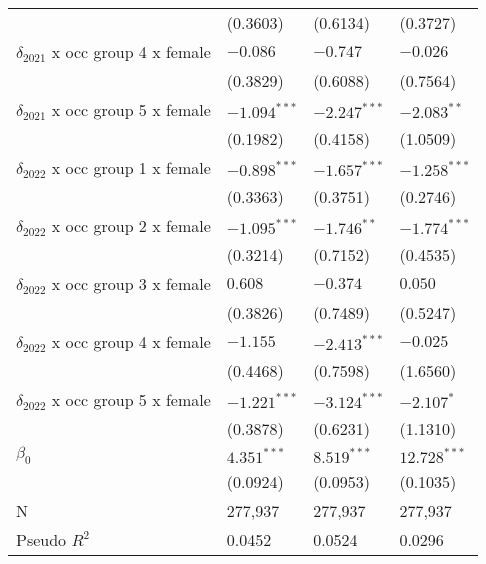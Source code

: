 \begin{tabular}{llll}
                                       &           (0.3603) &           (0.6134) &           (0.3727) \\
$\delta_{2021}$ x occ group 4 x female &           $-0.086$ &           $-0.747$ &           $-0.026$ \\
                                       &           (0.3829) &           (0.6088) &           (0.7564) \\
$\delta_{2021}$ x occ group 5 x female &     $-1.094^{***}$ &     $-2.247^{***}$ &      $-2.083^{**}$ \\
                                       &           (0.1982) &           (0.4158) &           (1.0509) \\
$\delta_{2022}$ x occ group 1 x female &     $-0.898^{***}$ &     $-1.657^{***}$ &     $-1.258^{***}$ \\
                                       &           (0.3363) &           (0.3751) &           (0.2746) \\
$\delta_{2022}$ x occ group 2 x female &     $-1.095^{***}$ &      $-1.746^{**}$ &     $-1.774^{***}$ \\
                                       &           (0.3214) &           (0.7152) &           (0.4535) \\
$\delta_{2022}$ x occ group 3 x female &            $0.608$ &           $-0.374$ &            $0.050$ \\
                                       &           (0.3826) &           (0.7489) &           (0.5247) \\
$\delta_{2022}$ x occ group 4 x female &           $-1.155$ &     $-2.413^{***}$ &           $-0.025$ \\
                                       &           (0.4468) &           (0.7598) &           (1.6560) \\
$\delta_{2022}$ x occ group 5 x female &     $-1.221^{***}$ &     $-3.124^{***}$ &         $-2.107^*$ \\
                                       &           (0.3878) &           (0.6231) &           (1.1310) \\
$\beta_0$                              &      $4.351^{***}$ &      $8.519^{***}$ &     $12.728^{***}$ \\
                                       &           (0.0924) &           (0.0953) &           (0.1035) \\
N                                      &            277,937 &            277,937 &            277,937 \\
Pseudo $R^2$                           &             0.0452 &             0.0524 &             0.0296 \\
\bottomrule
\end{tabular}
